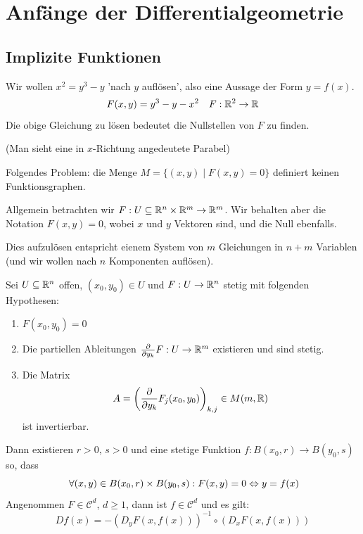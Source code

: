 \documentclass[main.tex]{subfiles}
\begin{document}
\chapter{Anfänge der Differentialgeometrie}


\section{Implizite Funktionen}

\begin{Beispiel}
  Wir wollen $x^2 = y^3 - y$ 'nach $y$ auflösen', also eine Aussage der Form $y = f(x)$.
  $$F(x,y) = y^3 - y - x^2 \quad F: \mathbb{R}^2 \to \mathbb{R}$$
  Die obige Gleichung zu lösen bedeutet die Nullstellen von $F$ zu finden.
  \begin{center}
  \end{center}
  (Man sieht eine in $x$-Richtung angedeutete Parabel)

  Folgendes Problem: die Menge $M = \{(x,y) \mid F(x,y) = 0\}$ definiert keinen Funktionsgraphen.
\end{Beispiel}

Allgemein betrachten wir $F : U \subseteq \mathbb{R}^n \times \mathbb{R}^m \to \mathbb{R}^m$. Wir behalten aber die Notation $F(x,y) = 0$, wobei $x$ und $y$ Vektoren sind, und die Null ebenfalls.

Dies aufzulösen entspricht eienem System von $m$ Gleichungen in $n+m$ Variablen (und wir wollen nach $n$ Komponenten auflösen).

\begin{Theorem}
  Sei $U \subseteq \mathbb{R}^n$ offen, $(x_0,y_0) \in U$ und $F: U \to \mathbb{R}^n$ stetig mit folgenden Hypothesen:
  \begin{enumerate}
    \item $F(x_0,y_0) = 0$
    \item Die partiellen Ableitungen $\frac{\partial}{\partial y_k} F : U \to \mathbb{R}^m$ existieren und sind stetig.
    \item Die Matrix
      $$A = \left(\dfrac{\partial}{\partial y_k} F_j (x_0,y_0)\right)_{k,j} \in M(m,\mathbb{R})$$
      ist invertierbar.
  \end{enumerate}
  Dann existieren $r > 0$, $s > 0$ und eine stetige Funktion $f: B(x_0, r) \to B(y_0,s)$ so, dass
  $$\;\forall (x,y) \in B(x_0, r) \times B(y_0,s) : F(x,y) = 0 \Leftrightarrow y = f(x)$$
  Angenommen $F \in \mathcal{C}^d$, $d \geq 1$, dann ist $f \in \mathcal{C}^d$ und es gilt:
  $$Df(x) = -(D_y F(x,f(x)))^{-1} \circ (D_x F(x,f(x)))$$
\end{Theorem}
\end{document}
